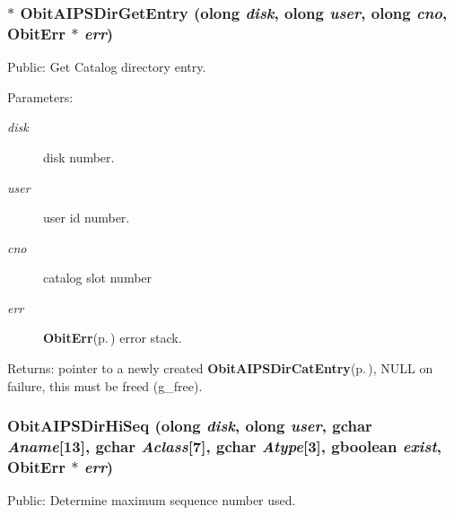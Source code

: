 \subsubsection{$\ast$ Obit\-AIPSDir\-Get\-Entry ({\bf olong} {\em disk}, {\bf olong} {\em user}, {\bf olong} {\em cno}, {\bf Obit\-Err} $\ast$ {\em err})}\label{ObitAIPSDir_8c_a25}


Public: Get Catalog directory entry. 

\begin{Desc}
\item[Parameters:]
\begin{description}
\item[{\em disk}]disk number. \item[{\em user}]user id number. \item[{\em cno}]catalog slot number \item[{\em err}]{\bf Obit\-Err}{\rm (p.\,\pageref{structObitErr})} error stack. \end{description}
\end{Desc}
\begin{Desc}
\item[Returns:]pointer to a newly created {\bf Obit\-AIPSDir\-Cat\-Entry}{\rm (p.\,\pageref{structObitAIPSDirCatEntry})}, NULL on failure, this must be freed (g\_\-free). \end{Desc}
\subsubsection{ Obit\-AIPSDir\-Hi\-Seq ({\bf olong} {\em disk}, {\bf olong} {\em user}, gchar {\em Aname}[13], gchar {\em Aclass}[7], gchar {\em Atype}[3], gboolean {\em exist}, {\bf Obit\-Err} $\ast$ {\em err})}\label{ObitAIPSDir_8c_a23}


Public: Determine maximum sequence number used. 

